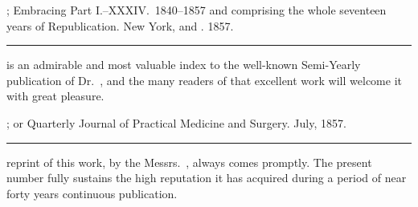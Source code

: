 \smallornament
\footnotesize
{}; Embracing Part I.--XXXIV.\ 1840--1857
and comprising the whole seventeen years of Republication. New York,  and
. 1857.
\plainbreak{1}
\normalsize

 is an admirable and most valuable index to the well-known
Semi-Yearly publication of Dr.\ , and the many readers of
that excellent work will welcome it with great pleasure.

\smallornament
\footnotesize
{}; or Quarterly Journal of Practical
Medicine and Surgery. July, 1857.
\plainbreak{1}
\normalsize

 reprint of this work, by the Messrs.\ , always comes
promptly. The present number fully sustains the high reputation it
has acquired during a period of near forty years continuous publication.\endinput

